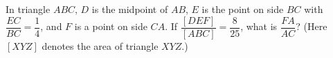 In triangle $ABC$, $D$ is the midpoint of $AB$, $E$ is the point on side $BC$ with $\dfrac{EC}{BC}=\dfrac14$, and $F$ is a point on side $CA$. If $\dfrac{[DEF]}{[ABC]}=\dfrac{8}{25}$, what is $\dfrac{FA}{AC}$? (Here $[XYZ]$ denotes the area of triangle $XYZ$.)
